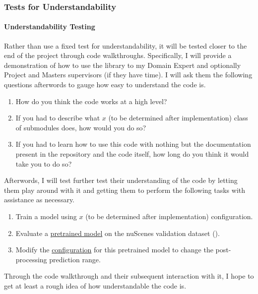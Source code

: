 \documentclass[12pt, titlepage]{article}
\begin{document}
\subsubsection{Tests for Understandability}

\paragraph{Understandability Testing}

Rather than use a fixed test for understandability, it will be tested closer to the end of the project through code walkthroughs. Specifically,
I will provide a demonstration of how to use the library to my Domain Expert and optionally Project and Masters supervisors (if they have time).
I will ask them the following questions afterwords to gauge how easy to understand the code is.
\begin{enumerate}
  \item How do you think the code works at a high level?
  \item If you had to describe what $x$ (to be determined after implementation) class of submodules does, how would you do so?
  \item If you had to learn how to use this code with nothing but the documentation present in the repository and the code itself, how long do you think it would take you to do so?
\end{enumerate}

Afterwords, I will test further test their understanding of the code by letting them play around with it and getting them to perform the following tasks with assistance as necessary.
\begin{enumerate}
  \item Train a model using $x$ (to be determined after implementation) configuration.
  \item Evaluate a \href{https://drive.google.com/file/d/1X50b-8immqlqD8VPAUkSKI0Ls-4k37g9/view}{pretrained model} on the nuScenes validation dataset (\cite{caesar2020nuscenes}).
  \item Modify the \href{https://github.com/open-mmlab/OpenPCDet/blob/master/tools/cfgs/nuscenes_models/bevfusion.yaml}{configuration} for this pretrained model to change the post-processing prediction range.
\end{enumerate}

Through the code walkthrough and their subsequent interaction with it, I hope to get at least a rough idea of how understandable the code is.
\end{document}
